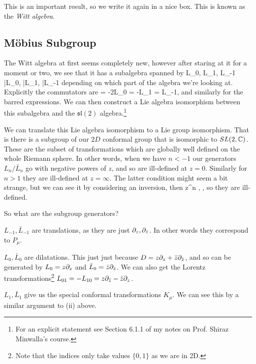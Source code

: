 This is an important result, so we write it again in a nice box. 
\noindent This is known as the \textit{Witt algebra}. 

\subsection{M\"{o}bius Subgroup}

The Witt algebra at first seems completely new, however after staring at it for a moment or two, we see that it has a subalgebra spanned by
\bse 
    L_0, L_1, L_{-1} \qquad {} \qquad \bar{L}_0, \bar{L}_1, \bar{L}_{-1}
\ese 
depending on which part of the algebra we're looking at. Explicitly the commutators are 
\bse 
    [L_{-1}, L_1] = -2L_0 \qquad [L_0,L_1] = -L_1 \qand [L_0,L_{-1}] = L_{-1},
\ese
and similarly for the barred expressions. We can then construct a Lie algebra isomorphism between this subalgebra and the $\mathfrak{sl}(2)$ algebra.\footnote{For an explicit statement see Section 6.1.1 of my notes on Prof. Shiraz Minwalla's course.}

We can translate this Lie algebra isomorphism to a Lie group isomorphism. That is there is a subgroup of our $2D$ conformal group that is isomorphic to $SL(2,\mathbb{C})$. These are the subset of transformations which are globally well defined on the whole Riemann sphere. In other words, when we have $n<-1$ our generators $L_n/\bar{L}_n$ go with negative powers of $z$, and so are ill-defined at $z=0$. Similarly for $n>1$ they are ill-defined at $z=\infty$. The latter condition might seem a bit strange, but we can see it by considering an inversion, then 
\bse 
    z^n \mapsto {}, \qand \infty {},
\ese 
so they are ill-defined.

So what are the subgroup generators?
\ben[label=(\roman*)]
    \item $L_{-1}, \bar{L}_{-1}$ are translations, as they are just $\partial_z, \partial_{\bar{z}}$. In other words they correspond to $P_{\mu}$. 
    \item $L_0, \bar{L}_0$ are dilatations. This just just because $D = z\partial_z + \bar{z}\partial_{\bar{z}}$, and so can be generated by $L_0 = z\partial_z$ and $\bar{L}_0 = \bar{z}\partial_{\bar{z}}$. We can also get the Lorentz transformations\footnote{Note that the indices only take values $\{0,1\}$ as we are in 2D.} $L_{01} = -L_{10} = z\partial_{\bar{z}} - \bar{z}\partial_z$.
    \item $L_1, \bar{L}_1$ give us the special conformal transformations $K_{\mu}$. We can see this by a similar argument to (ii) above. 
\een 

